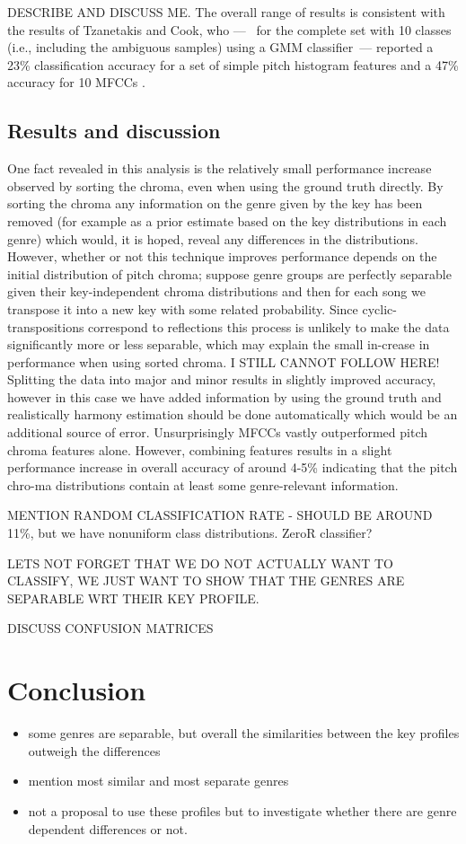 \documentclass{article}
\begin{document}
DESCRIBE AND DISCUSS ME.
The overall range of results is consistent with the results of Tzanetakis and Cook, who ---~ for the complete set with 10 classes (i.e., including the ambiguous samples) using a GMM classifier~--- reported a 23\% classification accuracy for a set of simple pitch histogram features and a 47\% accuracy for 10 MFCCs \cite{tzanetakis_musical_2002}. 

\subsection{Results and discussion}

One fact revealed in this analysis is the relatively small performance increase observed by sorting the chroma, even when using the ground truth directly. By sorting the chroma any information on the genre given by the key has been removed (for example as a prior estimate based on the key distributions in each genre) which would, it is hoped, reveal any differences in the distributions. 
However, whether or not this technique improves performance depends on the initial distribution of pitch chroma; suppose genre groups are perfectly separable given their key-independent chroma distributions and then for each song we transpose it into a new key with some related probability. Since cyclic-transpositions correspond to reflections this process is unlikely to make the data significantly more or less separable, which may explain the small in-crease in performance when using sorted chroma. I STILL CANNOT FOLLOW HERE!
Splitting the data into major and minor results in slightly improved accuracy, however in this case we have added information by using the ground truth and realistically harmony estimation should be done automatically which would be an additional source of error.
	Unsurprisingly MFCCs vastly outperformed pitch chroma features alone. However, combining features results in a slight performance increase in overall accuracy of around 4-5\% indicating that the pitch chro-ma distributions contain at least some genre-relevant information.
    
    MENTION RANDOM CLASSIFICATION RATE - SHOULD BE AROUND 11\%, but we have nonuniform class distributions. ZeroR classifier?
    
    LETS NOT FORGET THAT WE DO NOT ACTUALLY WANT TO CLASSIFY, WE JUST WANT TO SHOW THAT THE GENRES ARE SEPARABLE WRT THEIR KEY PROFILE.
    
    DISCUSS CONFUSION MATRICES

\section{Conclusion}
\begin{itemize}
    \item   some genres are separable, but overall the similarities between the key profiles outweigh the differences
    \item   mention most similar and most separate genres
    \item   not a proposal to use these profiles but to investigate whether there are genre dependent differences or not.
\end{itemize}



\end{document}
